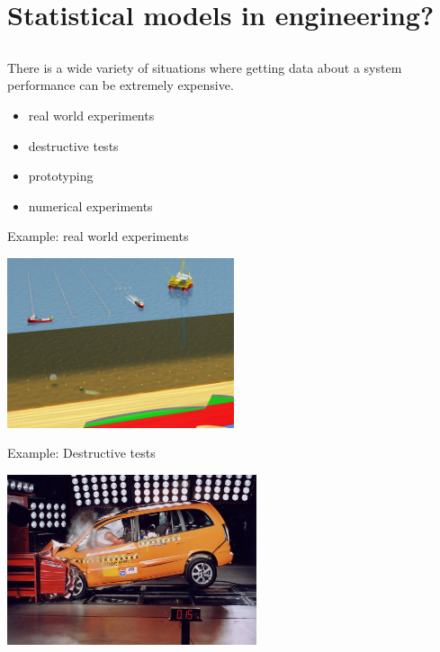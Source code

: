 \section[Statistical Models]{Statistical models in engineering?}
\subsection{}
\begin{frame}{}
There is a wide variety of situations where getting data about a system performance can be extremely expensive.
\begin{itemize}
	\item real world experiments
	\item destructive tests
	\item prototyping
	\item numerical experiments
\end{itemize}
\end{frame}

\begin{frame}{}
\begin{exampleblock}{Example: real world experiments}
\begin{center}
\includegraphics[height=5cm]{1_stat_models/figures/drilling}
\end{center}
\end{exampleblock}
\end{frame}

\begin{frame}{}
\begin{exampleblock}{Example: Destructive tests}
\begin{center}
\includegraphics[height=5cm]{1_stat_models/figures/crash-test}
\end{center}
\end{exampleblock}
\end{frame}

